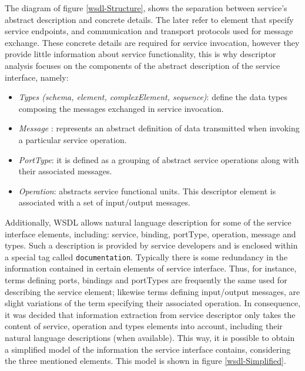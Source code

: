 The diagram of figure \ref{wsdl-Structure}, shows the separation between service’s abstract description and concrete details. The later refer to element that specify service endpoints, and communication and transport protocols used for message exchange. These concrete details are required for service invocation, however they provide little information about service functionality, this is why descriptor analysis focuses on the components of the abstract description of the service interface, namely:

\begin{itemize}
 \item \textit{Types (schema, element, complexElement, sequence)}: define the data types composing the messages exchanged in service invocation.
 \item \textit{Message} : represents an abstract definition of data transmitted when invoking a particular service operation.
 \item \textit{PortType}: it is defined as a grouping of abstract service operations along with their associated messages.
 \item \textit{Operation}: abstracts service functional units. This descriptor element is associated with a set of input/output messages.
\end{itemize}

Additionally, WSDL allows natural language description for some of the service interface elements, including: service, binding, portType, operation, message and types. Such a description is provided by service developers and is enclosed within a special tag called \texttt{documentation}. Typically there is some redundancy in the information contained in certain elements of service interface. Thus, for instance, terms defining ports, bindings and portTypes are frequently the same used for describing the service element; likewise terms defining input/output messages, are slight variations of the term specifying their associated operation. In consequence, it was decided that information extraction from service descriptor only takes the content of service, operation and types elements into account, including their natural language descriptions (when available). This way, it is possible to obtain a simplified model of the information the service interface contains, considering the three 
mentioned elements. This model is shown in figure \ref{wsdl-Simplified}.

